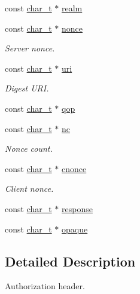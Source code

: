 \begin{DoxyCompactItemize}
const \hyperlink{compiler__port_8h_a40bb5262bf908c328fbcfbe5d29d0201}{char\+\_\+t} $\ast$ \hyperlink{structHttpAuthorizationHeader_a1a9b313d0b2bcb0f2de620d87f3638cf}{realm}
\item 
const \hyperlink{compiler__port_8h_a40bb5262bf908c328fbcfbe5d29d0201}{char\+\_\+t} $\ast$ \hyperlink{structHttpAuthorizationHeader_ad414b477649a2aab5094559a281786b3}{nonce}
\begin{DoxyCompactList}\small\item\em Server nonce. \end{DoxyCompactList}\item 
const \hyperlink{compiler__port_8h_a40bb5262bf908c328fbcfbe5d29d0201}{char\+\_\+t} $\ast$ \hyperlink{structHttpAuthorizationHeader_a50fc4f4b4c0adbc85cfbd93a31ff6cfa}{uri}
\begin{DoxyCompactList}\small\item\em Digest U\+RI. \end{DoxyCompactList}\item 
const \hyperlink{compiler__port_8h_a40bb5262bf908c328fbcfbe5d29d0201}{char\+\_\+t} $\ast$ \hyperlink{structHttpAuthorizationHeader_aa4898fb5e5bf52971ec735c9111ce9dd}{qop}
\item 
const \hyperlink{compiler__port_8h_a40bb5262bf908c328fbcfbe5d29d0201}{char\+\_\+t} $\ast$ \hyperlink{structHttpAuthorizationHeader_a7ecc070d92b64c544a5a3d036a3ff2d6}{nc}
\begin{DoxyCompactList}\small\item\em Nonce count. \end{DoxyCompactList}\item 
const \hyperlink{compiler__port_8h_a40bb5262bf908c328fbcfbe5d29d0201}{char\+\_\+t} $\ast$ \hyperlink{structHttpAuthorizationHeader_aa5dda5ba9a1648e6532776151b09fe0e}{cnonce}
\begin{DoxyCompactList}\small\item\em Client nonce. \end{DoxyCompactList}\item 
const \hyperlink{compiler__port_8h_a40bb5262bf908c328fbcfbe5d29d0201}{char\+\_\+t} $\ast$ \hyperlink{structHttpAuthorizationHeader_ab9af82caf503c954449395b5d3473d42}{response}
\item 
const \hyperlink{compiler__port_8h_a40bb5262bf908c328fbcfbe5d29d0201}{char\+\_\+t} $\ast$ \hyperlink{structHttpAuthorizationHeader_a3019021c840376ab709b7f342a10f069}{opaque}
\end{DoxyCompactItemize}


\subsection{Detailed Description}
Authorization header. 

